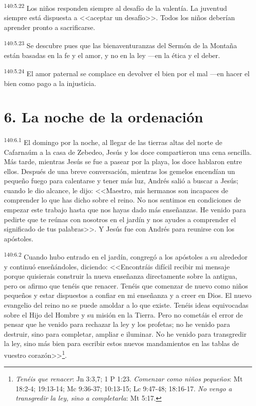 \par 
\textsuperscript{140:5.22} Los niños responden siempre al desafío de la valentía. La juventud siempre está dispuesta a <<aceptar un desafío>>. Todos los niños deberían aprender pronto a sacrificarse.

\par 
\textsuperscript{140:5.23} Se descubre pues que las bienaventuranzas del Sermón de la Montaña están basadas en la fe y el amor, y no en la ley ---en la ética y el deber.

\par 
\textsuperscript{140:5.24} El amor paternal se complace en devolver el bien por el mal ---en hacer el bien como pago a la injusticia.

\section*{6. La noche de la ordenación}
\par 
\textsuperscript{140:6.1} El domingo por la noche, al llegar de las tierras altas del norte de Cafarnaúm a la casa de Zebedeo, Jesús y los doce compartieron una cena sencilla. Más tarde, mientras Jesús se fue a pasear por la playa, los doce hablaron entre ellos. Después de una breve conversación, mientras los gemelos encendían un pequeño fuego para calentarse y tener más luz, Andrés salió a buscar a Jesús; cuando le dio alcance, le dijo: <<Maestro, mis hermanos son incapaces de comprender lo que has dicho sobre el reino. No nos sentimos en condiciones de empezar este trabajo hasta que nos hayas dado más enseñanzas. He venido para pedirte que te reúnas con nosotros en el jardín y nos ayudes a comprender el significado de tus palabras>>. Y Jesús fue con Andrés para reunirse con los apóstoles.

\par 
\textsuperscript{140:6.2} Cuando hubo entrado en el jardín, congregó a los apóstoles a su alrededor y continuó enseñándoles, diciendo: <<Encontráis difícil recibir mi mensaje porque quisierais construir la nueva enseñanza directamente sobre la antigua, pero os afirmo que tenéis que renacer. Tenéis que comenzar de nuevo como niños pequeños y estar dispuestos a confiar en mi enseñanza y a creer en Dios. El nuevo evangelio del reino no se puede amoldar a lo que existe. Tenéis ideas equivocadas sobre el Hijo del Hombre y su misión en la Tierra. Pero no cometáis el error de pensar que he venido para rechazar la ley y los profetas; no he venido para destruir, sino para completar, ampliar e iluminar. No he venido para transgredir la ley, sino más bien para escribir estos nuevos mandamientos en las tablas de vuestro corazón>>\footnote{\textit{Tenéis que renacer}: Jn 3:3,7; 1 P 1:23. \textit{Comenzar como niños pequeños}: Mt 18:2-4; 19:13-14; Mc 9:36-37; 10:13-15; Lc 9:47-48; 18:16-17. \textit{No vengo a transgredir la ley, sino a completarla}: Mt 5:17.}.

